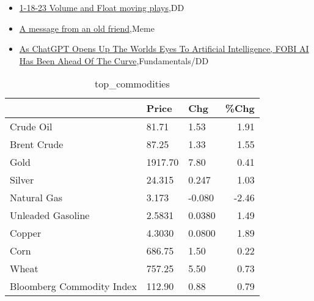 \documentclass{article}%
\begin{document}
%
\begin{itemize}%
\item%
\href{https://reddit.com/r/wallstreetbets/comments/10f6n0o/11823\_volume\_and\_float\_moving\_plays/}{1-18-23 Volume and Float moving plays},DD%
\item%
\href{https://reddit.com/r/wallstreetbets/comments/10f5m8v/a\_message\_from\_an\_old\_friend/}{A message from an old friend},Meme%
\item%
\href{https://reddit.com/r/StockMarket/comments/10f1e0j/as\_chatgpt\_opens\_up\_the\_worlds\_eyes\_to\_artificial/}{As ChatGPT Opens Up The Worlds Eyes To Artificial Intelligence, FOBI AI Has Been Ahead Of The Curve},Fundamentals/DD%
\end{itemize}%


\begin{table}[htbp]%
\caption{top\_commodities}%
\centering%
\begin{adjustbox}{width=1\textwidth}%
\begin{tabular}{lllr}
\toprule
                          &   Price &    Chg &  \%Chg \\
\midrule
               Crude Oil  &   81.71 &   1.53 &  1.91 \\
             Brent Crude  &   87.25 &   1.33 &  1.55 \\
                    Gold  & 1917.70 &   7.80 &  0.41 \\
                  Silver  &  24.315 &  0.247 &  1.03 \\
             Natural Gas  &   3.173 & -0.080 & -2.46 \\
       Unleaded Gasoline  &  2.5831 & 0.0380 &  1.49 \\
                  Copper  &  4.3030 & 0.0800 &  1.89 \\
                    Corn  &  686.75 &   1.50 &  0.22 \\
                   Wheat  &  757.25 &   5.50 &  0.73 \\
Bloomberg Commodity Index &  112.90 &   0.88 &  0.79 \\
\bottomrule
\end{tabular}
%
\end{adjustbox}%
\end{table}

%
\end{document}
